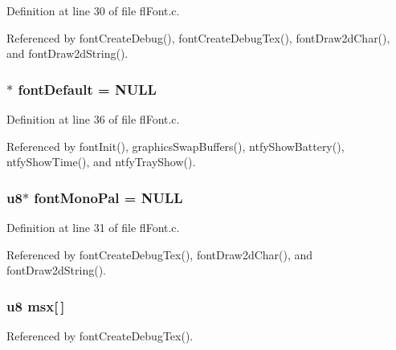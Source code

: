 Definition at line 30 of file fl\-Font.c.

Referenced by font\-Create\-Debug(), font\-Create\-Debug\-Tex(), font\-Draw2d\-Char(), and font\-Draw2d\-String().
\subsubsection{$\ast$ {\bf font\-Default} = NULL}\label{flFont_8c_b1e771ff1965e62f65eab80b2ca4475f}




Definition at line 36 of file fl\-Font.c.

Referenced by font\-Init(), graphics\-Swap\-Buffers(), ntfy\-Show\-Battery(), ntfy\-Show\-Time(), and ntfy\-Tray\-Show().
\subsubsection{\setlength{\rightskip}{0pt plus 5cm}u8$\ast$ {\bf font\-Mono\-Pal} = NULL}\label{flFont_8c_c052cbaf897ef9ff80c958ca1099f64a}




Definition at line 31 of file fl\-Font.c.

Referenced by font\-Create\-Debug\-Tex(), font\-Draw2d\-Char(), and font\-Draw2d\-String().
\subsubsection{\setlength{\rightskip}{0pt plus 5cm}u8 {\bf msx}[$\,$]}\label{flFont_8c_fd6d8db70c0aefa39fc4dea1108e309b}




Referenced by font\-Create\-Debug\-Tex().